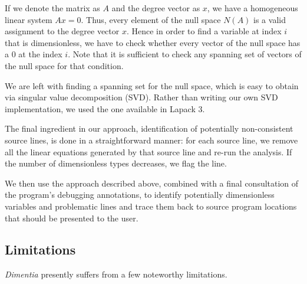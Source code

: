 \documentclass[12pt]{article}
\begin{document}
If we denote the matrix as $A$ and the degree vector as $x$, we have a homogeneous linear system $Ax = 0$.
Thus, every element of the null space $N(A)$ is a valid assignment to the degree vector $x$.
Hence in order to find a variable at index $i$ that is dimensionless, we have to check whether every vector of the null space has a $0$ at the index $i$.
Note that it is sufficient to check any spanning set of vectors of the null space for that condition.

We are left with finding a spanning set for the null space, which is easy to obtain via singular value decomposition (SVD).
Rather than writing our own SVD implementation, we used the one available in Lapack 3.

The final ingredient in our approach, identification of potentially non-consistent source lines, is done in a straightforward manner: for each source line, we remove all the linear equations generated by that source line and re-run the analysis.
If the number of dimensionless types decreases, we flag the line.

We then use the approach described above, combined with a final consultation of the program's debugging annotations, to identify potentially dimensionless variables and problematic lines and trace them back to source program locations that should be presented to the user.

\subsection{Limitations}

\textit{Dimentia} presently suffers from a few noteworthy limitations.
\end{document}
